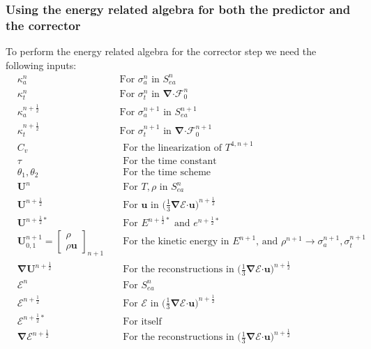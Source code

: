 \documentclass[10pt,letterpaper,notitlepage]{article}
\numberwithin{equation}{section}
\newcommand{\bnabla}{\boldsymbol{\nabla}}
\newcommand{\velocity}{\mathbf{u}}
\newcommand{\dotp}{\boldsymbol{\cdot}}
\newcommand{\RadE}{\mathcal{E}}
\newcommand{\RadF}{\boldsymbol{\mathcal{F}}}
\newcommand{\HydroU}{\mathbf{U}}
\newcommand{\HydroRhoRhoU}{\begin{bmatrix}
		\rho \\ \rho \velocity
\end{bmatrix}}
\newcommand{\RadJ}{\RadF_0}
\newcommand{\half}{\frac{1}{2}}
\newcommand{\beq}{\begin{equation*} \begin{aligned}}
\newcommand{\eeq}{\end{aligned}\end{equation*}}
\begin{document}
\subsubsection{Using the energy related algebra for both the predictor and the corrector}
To perform the energy related algebra for the corrector step we need the following inputs:
\beq
&\kappa_a^n &&\text{For }\sigma_a^n \text{ in }S_{ea}^n \\
&\kappa_t^n &&\text{For }\sigma_t^n \text{ in }\bnabla \dotp \RadJ^{n}\\
&\kappa_a^{n+\half} &&\text{For }\sigma_a^{n+1} \text{ in }S_{ea}^{n+1} \\
&\kappa_t^{n+\half} &&\text{For }\sigma_t^{n+1} \text{ in }\bnabla \dotp \RadJ^{n+1}\\
&C_v && \text{ For the linearization of } T^{4,n+1}\\
&\tau && \text{ For the time constant} \\
&\theta_1 ,\theta_2 &&\text{ For the time scheme} \\
&\HydroU^{n} && \text{ For } T, \rho \text{ in } S_{ea}^n \\
&\HydroU^{n+\half} && \text{ For } \velocity \text{ in }  \biggr( \frac{1}{3} \bnabla \RadE \dotp \velocity \biggr)^{n+\half}\\
&\HydroU^{n+\half*}  &&\text{ For } E^{n+\half*}\text{ and } e^{n+\half*}\\
&\HydroU_{0,1}^{n+1} = \HydroRhoRhoU_{n+1} &&\text{ For the kinetic energy in } E^{n+1}\text{, and }\rho^{n+1} \to \sigma_a^{n+1}, \sigma_t^{n+1} \\
&\bnabla \HydroU^{n+\half} && \text{ For the reconstructions in } \biggr( \frac{1}{3} \bnabla \RadE \dotp \velocity \biggr)^{n+\half}\\
&\RadE^{n} && \text{ For } S_{ea}^n \\
&\RadE^{n+\half} &&\text{ For } \RadE \text{ in }\biggr( \frac{1}{3} \bnabla \RadE \dotp \velocity \biggr)^{n+\half}\\
&\RadE^{n+\half*} &&\text{ For itself}\\
&\bnabla \RadE^{n+\half} &&\text{ For the reconstructions in } \biggr( \frac{1}{3} \bnabla \RadE \dotp \velocity \biggr)^{n+\half}\\
\eeq
\end{document}
